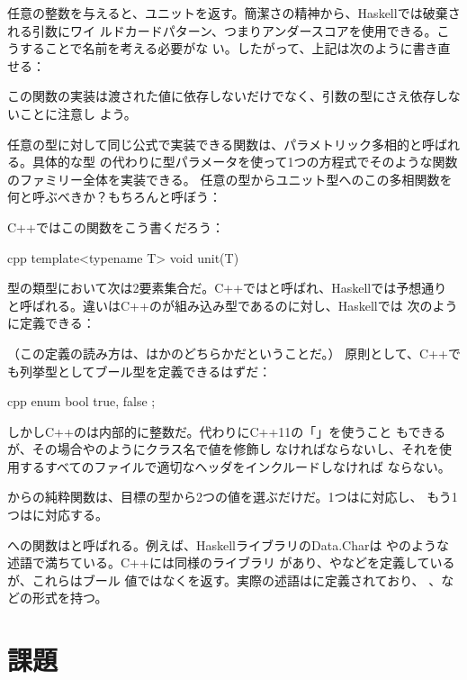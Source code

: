 任意の整数を与えると、ユニットを返す。簡潔さの精神から、Haskellでは破棄される引数にワイ
ルドカードパターン、つまりアンダースコアを使用できる。こうすることで名前を考える必要がな
い。したがって、上記は次のように書き直せる：

この関数の実装は渡された値に依存しないだけでなく、引数の型にさえ依存しないことに注意し
よう。

任意の型に対して同じ公式で実装できる関数は、パラメトリック多相的と呼ばれる。具体的な型
の代わりに型パラメータを使って1つの方程式でそのような関数のファミリー全体を実装できる。
任意の型からユニット型へのこの多相関数を何と呼ぶべきか？もちろんと呼ぼう：

C++ではこの関数をこう書くだろう：

\begin{snip}{cpp}
template<typename T>
void unit(T) {}
\end{snip}
型の類型において次は2要素集合だ。C++ではと呼ばれ、Haskellでは予想通り
と呼ばれる。違いはC++のが組み込み型であるのに対し、Haskellでは
次のように定義できる：

（この定義の読み方は、はかのどちらかだということだ。）
原則として、C++でも列挙型としてブール型を定義できるはずだ：

\begin{snip}{cpp}
enum bool {
    true,
    false
};
\end{snip}
しかしC++のは内部的に整数だ。代わりにC++11の「」を使うこと
もできるが、その場合やのようにクラス名で値を修飾し
なければならないし、それを使用するすべてのファイルで適切なヘッダをインクルードしなければ
ならない。

からの純粋関数は、目標の型から2つの値を選ぶだけだ。1つはに対応し、
もう1つはに対応する。

への関数はと呼ばれる。例えば、HaskellライブラリのData.Charは
やのような述語で満ちている。C++には同様のライブラリ
があり、やなどを定義しているが、これらはブール
値ではなくを返す。実際の述語はに定義されており、
、などの形式を持つ。

\section{課題}

